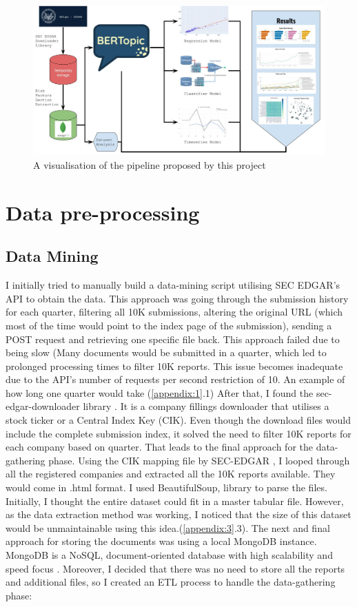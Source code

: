 \documentclass[12pt,MSc,a4paper,oneside]{muthesis}
\begin{document}
\begin{figure}[h]
  \centering
  \includegraphics[scale=0.25]{images/Thesis pipeline.jpg}
  \caption{A visualisation of the pipeline proposed by this project}
\end{figure}

\section{Data pre-processing}

\subsection{Data Mining}

I initially tried to manually build a data-mining script utilising SEC EDGAR's API to obtain the data. This approach was going through the submission history for each quarter, filtering all 10K submissions, altering the original URL (which most of the time would point to the index page of the submission), sending a POST request and retrieving one specific file back. This approach failed due to being slow (Many documents would be submitted in a quarter, which led to prolonged processing times to filter 10K reports. This issue becomes inadequate due to the API's number of requests per second restriction of 10. An example of how long one quarter would take (\ref{appendix:1}.1)
  After that, I found the sec-edgar-downloader library \cite{sec-edgar-downloader}. It is a company fillings downloader that utilises a stock ticker or a Central Index Key (CIK). Even though the download files would include the complete submission index, it solved the need to filter 10K reports for each company based on quarter. That leads to the final approach for the data-gathering phase. Using the CIK mapping file by SEC-EDGAR \cite{sec-company-tickers}, I looped through all the registered companies and extracted all the 10K reports available. They would come in .html format. I used BeautifulSoup,\cite{bs4} library to parse the files. Initially, I thought the entire dataset could fit in a master tabular file. However, as the data extraction method was working, I noticed that the size of this dataset would be unmaintainable using this idea.(\ref{appendix:3}.3). The next and final approach for storing the documents was using a local MongoDB instance. MongoDB is a NoSQL, document-oriented database with high scalability and speed focus \cite{mongodb}. Moreover, I decided that there was no need to store all the reports and additional files, so I created an ETL process \cite{etl} to handle the data-gathering phase:
\end{document}
